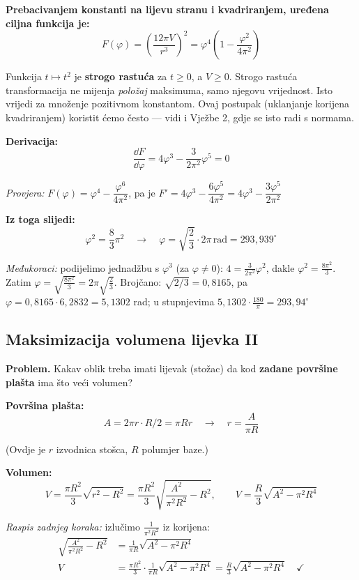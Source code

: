 \textbf{Prebacivanjem konstanti na lijevu stranu i kvadriranjem, uređena ciljna
funkcija je:}
\[
F(\varphi) = \left(\frac{12\pi V}{r^3}\right)^{2}
= \varphi^4\left(1 - \frac{\varphi^2}{4\pi^2}\right)
\]

\begin{napomena}
Funkcija $t \mapsto t^2$ je \textbf{strogo rastuća} za $t \ge 0$, a $V \ge 0$.
Strogo rastuća transformacija ne mijenja \emph{položaj} maksimuma, samo njegovu
vrijednost. Isto vrijedi za množenje pozitivnom konstantom. Ovaj postupak
(uklanjanje korijena kvadriranjem) koristit ćemo često --- vidi i Vježbe 2, gdje
se isto radi s normama.
\end{napomena}

\textbf{Derivacija:}
\[
\frac{\dd F}{\dd \varphi} = 4\varphi^3 - \frac{3}{2\pi^2}\varphi^5 = 0
\]

\emph{Provjera:} $F(\varphi) = \varphi^4 - \dfrac{\varphi^6}{4\pi^2}$, pa je
$F' = 4\varphi^3 - \dfrac{6\varphi^5}{4\pi^2}
    = 4\varphi^3 - \dfrac{3\varphi^5}{2\pi^2}$ \checkmark

\textbf{Iz toga slijedi:}
\[
\varphi^2 = \frac{8}{3}\pi^2 \quad \to \quad
\varphi = \sqrt{\frac{2}{3}}\cdot 2\pi \,\text{rad} = 293{,}939^\circ
\]

\emph{Međukoraci:} podijelimo jednadžbu s $\varphi^3$ (za $\varphi \ne 0$):
$4 = \tfrac{3}{2\pi^2}\varphi^2$, dakle $\varphi^2 = \tfrac{8\pi^2}{3}$. Zatim
$\varphi = \sqrt{\tfrac{8\pi^2}{3}} = 2\pi\sqrt{\tfrac{2}{3}}$. Brojčano:
$\sqrt{2/3} = 0{,}8165$, pa $\varphi = 0{,}8165 \cdot 6{,}2832 = 5{,}1302$ rad;
u stupnjevima $5{,}1302 \cdot \tfrac{180}{\pi} = 293{,}94^\circ$ \checkmark

\subsection{Maksimizacija volumena lijevka II}

\textbf{Problem.} Kakav oblik treba imati lijevak (stožac) da kod \textbf{zadane
površine plašta} ima što veći volumen?

\textbf{Površina plašta:}
\[
A = 2\pi r \cdot R / 2 = \pi R r \quad \to \quad r = \frac{A}{\pi R}
\]

(Ovdje je $r$ izvodnica stošca, $R$ polumjer baze.)

\textbf{Volumen:}
\[
V = \frac{\pi R^2}{3}\sqrt{r^2 - R^2}
  = \frac{\pi R^2}{3}\sqrt{\frac{A^2}{\pi^2R^2} - R^2}, \qquad
V = \frac{R}{3}\sqrt{A^2 - \pi^2R^4}
\]

\emph{Raspis zadnjeg koraka:} izlučimo $\tfrac{1}{\pi^2R^2}$ iz korijena:
\begin{align}
\sqrt{\frac{A^2}{\pi^2R^2} - R^2} &= \frac{1}{\pi R}\sqrt{A^2 - \pi^2 R^4} \\
V &= \frac{\pi R^2}{3}\cdot\frac{1}{\pi R}\sqrt{A^2 - \pi^2R^4}
   = \frac{R}{3}\sqrt{A^2 - \pi^2R^4} \quad \checkmark
\end{align}

